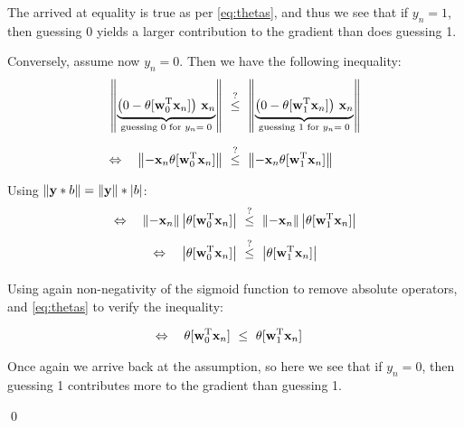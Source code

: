 The arrived at equality is true as per \cref{eq:thetas}, and thus we see that if
$y_n = 1$, then guessing 0 yields a larger contribution to the gradient than
does guessing 1.


\bigskip

\bigskip

\noindent Conversely, assume now $y_n = 0$. Then we have the following inequality:
\begin{alignat*}{2}
  \norm{\underbrace{\big(0 - \theta[\wzt \mbf x_n]\big)\ \mbf x_n
  }_{\text{guessing 0 for } y_n =\; 0}}\ &\myleq\ \norm{\underbrace{\big(0 - \theta[\wot \mbf
  x_n]\big)\ \mbf x_n}_{\text{guessing 1 for }y_n =\; 0}  }\\[6pt]
  \Leftrightarrow\quad
   \norm{- \mbf x_n \theta[\wzt \mbf x_n] }\  &\myleq\ \norm{- \mbf x_n \theta[\wot \mbf x_n] }
\end{alignat*}

\smallskip

Using $\lVert \mathbf{y} * b\rVert = \lVert \mathbf{y} \rVert * |b|$:
\begin{align*}
  \Leftrightarrow\quad\norm{- \mbf x_n }\abs{\theta[\wzt \mbf x_n]} \  &\myleq\
  \norm{- \mbf x_n  }\abs{\theta[\wot \mbf x_n]}\\[4pt]
   \Leftrightarrow\quad\abs{\theta[\wzt \mbf x_n]} \  &\myleq\ \abs{\theta[\wot \mbf
   x_n]}\\[4pt]
\end{align*}

Using again non-negativity of the sigmoid function to remove absolute operators,
and \cref{eq:thetas} to verify the inequality:

\begin{align*}
   \Leftrightarrow\quad\theta[\mathbf{w}_0^{\text{T}} \mathbf{x}_n] \  &\leq\ \theta[\mathbf{w}_1^{\text{T}} \mathbf{x}_n]
\end{align*}

Once again we arrive back at the assumption, so here we see that if $y_n = 0$,
then guessing 1 contributes more to the gradient than guessing 1.

\qed

\sectend
